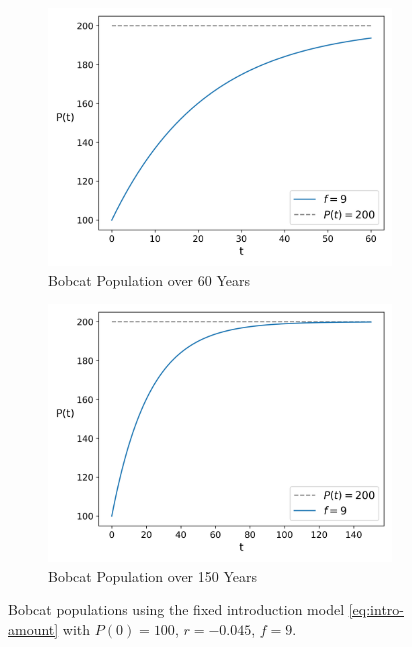 \documentclass{article}
\begin{document}
\begin{figure}[h]
    \centering
    \begin{subfigure}{.5\textwidth}
        \centering
        \includegraphics[width=.95\linewidth]{./introduction_strategy/200_short_term.png}
        \caption{Bobcat Population over 60 Years}
        \label{fig:intro-strategy-200-short-term}
    \end{subfigure}%
    \begin{subfigure}{.5\textwidth}
        \centering
        \includegraphics[width=.95\linewidth]{./introduction_strategy/200_long_term.png}
        \caption{Bobcat Population over 150 Years}
        \label{fig:intro-strategy-200-long-term}
    \end{subfigure}
    \caption{Bobcat populations using the fixed introduction model \cref{eq:intro-amount} with $P(0) = 100$, $r = -0.045$, $f = 9$.}
    \label{fig:7}
\end{figure}
\end{document}
